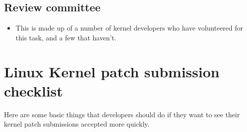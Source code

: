 \documentclass[a4paper,8pt,english]{sphinxmanual}
\begin{document}
\section{Review committee}
\label{process/stable-kernel-rules:review-committee}\begin{itemize}
\item {} 
This is made up of a number of kernel developers who have volunteered for
this task, and a few that haven't.

\end{itemize}


\chapter{Linux Kernel patch submission checklist}
\label{process/submit-checklist:linux-kernel-patch-submission-checklist}\label{process/submit-checklist::doc}\label{process/submit-checklist:submitchecklist}
Here are some basic things that developers should do if they want to see their
kernel patch submissions accepted more quickly.
\end{document}

